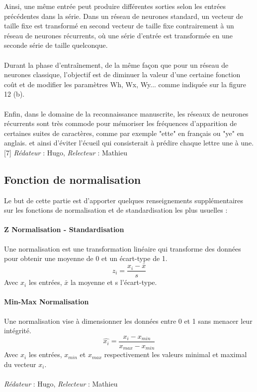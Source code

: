 \documentclass[oneside,a4paper,13pt]{article}
\begin{document}
Ainsi, une même entrée peut produire différentes sorties selon les entrées précédentes dans la série. Dans un réseau de neurones standard, un vecteur de taille fixe est transformé en second vecteur de taille fixe contrairement à un réseau de neurones récurrents, où une série d'entrée est transformée en une seconde série de taille quelconque.\\ \\
Durant la phase d'entraînement, de la même façon que pour un réseau de neurones classique, l'objectif est de diminuer la valeur d'une certaine fonction coût et de modifier les paramètres Wh, Wx, Wy... comme indiquée sur la figure 12 (b).\\ \\
Enfin, dans le domaine de la reconnaissance manuscrite, les réseaux de neurones récurrents sont très commode pour mémoriser les fréquences d'apparition de certaines suites de caractères, comme par exemple "ette" en français ou "ye" en anglais. et ainsi d'éviter l'écueil qui consisterait à prédire chaque lettre une à une.[7]
\smallbreak\textit{Rédateur} : Hugo, \textit{Relecteur} : Mathieu
\subsection*{Fonction de normalisation}
Le but de cette partie est d'apporter quelques renseignements supplémentaires sur les fonctions de normalisation et de standardisation les plus usuelles :
\paragraph{Z Normalisation - Standardisation}
\smallbreak
Une normalisation est une transformation linéaire qui transforme des données pour obtenir une moyenne de 0 et un écart-type de 1.
\begin{equation}
z_{i} = \frac{x_{i}-\bar{x}}{s}
\end{equation}
Avec $x_{i}$ les entrées, $\bar{x}$ la moyenne et s l'écart-type.
\paragraph{Min-Max Normalisation}

Une normalisation vise à dimensionner les données entre 0 et 1 sans menacer leur intégrité.
\begin{equation}
\hat{x_{i}} = \frac{x_{i}-x_{min}}{x_{max}-x_{min}}
\end{equation}
Avec $x_{i}$ les entrées, $x_{min}$ et $x_{max}$ respectivement les valeurs minimal et maximal du vecteur $x_{i}$.\\ \\
\smallbreak\textit{Rédateur} : Hugo, \textit{Relecteur} : Mathieu
\end{document}
